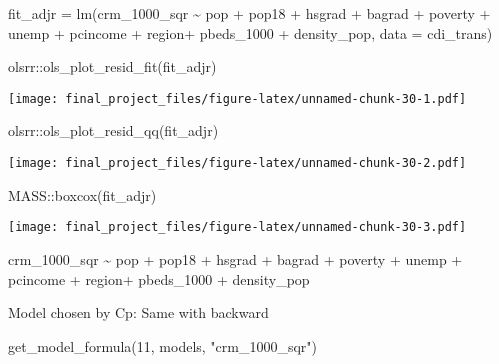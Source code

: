 \documentclass[
]{article}
\newenvironment{Shaded}{\begin{snugshade}}{\end{snugshade}}
\newcommand{\AttributeTok}[1]{\textcolor[rgb]{0.77,0.63,0.00}{#1}}
\newcommand{\DecValTok}[1]{\textcolor[rgb]{0.00,0.00,0.81}{#1}}
\newcommand{\FunctionTok}[1]{\textcolor[rgb]{0.00,0.00,0.00}{#1}}
\newcommand{\NormalTok}[1]{#1}
\newcommand{\OtherTok}[1]{\textcolor[rgb]{0.56,0.35,0.01}{#1}}
\newcommand{\SpecialCharTok}[1]{\textcolor[rgb]{0.00,0.00,0.00}{#1}}
\newcommand{\StringTok}[1]{\textcolor[rgb]{0.31,0.60,0.02}{#1}}
\begin{document}
\begin{Shaded}
\begin{Highlighting}[]
\NormalTok{fit\_adjr }\OtherTok{=} \FunctionTok{lm}\NormalTok{(crm\_1000\_sqr }\SpecialCharTok{\textasciitilde{}}\NormalTok{ pop }\SpecialCharTok{+}\NormalTok{ pop18 }\SpecialCharTok{+}\NormalTok{ hsgrad }\SpecialCharTok{+}\NormalTok{ bagrad }\SpecialCharTok{+}\NormalTok{ poverty }\SpecialCharTok{+}\NormalTok{ unemp }\SpecialCharTok{+}\NormalTok{ pcincome }\SpecialCharTok{+}\NormalTok{ region}\SpecialCharTok{+}\NormalTok{ pbeds\_1000 }\SpecialCharTok{+}\NormalTok{ density\_pop, }\AttributeTok{data =}\NormalTok{ cdi\_trans)}

\NormalTok{olsrr}\SpecialCharTok{::}\FunctionTok{ols\_plot\_resid\_fit}\NormalTok{(fit\_adjr)}
\end{Highlighting}
\end{Shaded}

\texttt{[image: final\_project\_files/figure-latex/unnamed-chunk-30-1.pdf]}

\begin{Shaded}
\begin{Highlighting}[]
\NormalTok{olsrr}\SpecialCharTok{::}\FunctionTok{ols\_plot\_resid\_qq}\NormalTok{(fit\_adjr)}
\end{Highlighting}
\end{Shaded}

\texttt{[image: final\_project\_files/figure-latex/unnamed-chunk-30-2.pdf]}

\begin{Shaded}
\begin{Highlighting}[]
\NormalTok{MASS}\SpecialCharTok{::}\FunctionTok{boxcox}\NormalTok{(fit\_adjr)}
\end{Highlighting}
\end{Shaded}

\texttt{[image: final\_project\_files/figure-latex/unnamed-chunk-30-3.pdf]}

crm\_1000\_sqr \textasciitilde{} pop + pop18 + hsgrad + bagrad + poverty
+ unemp + pcincome + region+ pbeds\_1000 + density\_pop

Model chosen by Cp: Same with backward

\begin{Shaded}
\begin{Highlighting}[]
\FunctionTok{get\_model\_formula}\NormalTok{(}\DecValTok{11}\NormalTok{, models, }\StringTok{"crm\_1000\_sqr"}\NormalTok{)}
\end{Highlighting}
\end{Shaded}
\end{document}
